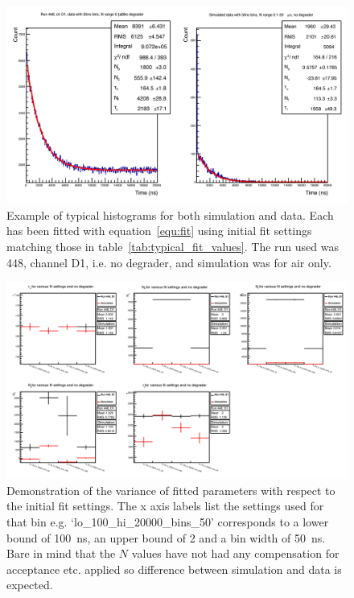 %
\begin{figure}[htbp]
    \centering
        \includegraphics[width=\textwidth]{images/example_fits_data_and_sim.png}
    \caption{Example of typical histograms for both simulation and data. Each has been fitted with equation~\ref{equ:fit} using initial fit settings matching those in table~\ref{tab:typical_fit_values}. The run used was 448, channel D1, i.e. no degrader, and simulation was for air only.}
    \label{fig:example_fits_data_and_sim}
\end{figure}

\begin{figure}[htbp]
    \centering
        \includegraphics[width=\textwidth]{images/sim_vs_data_parameter_WRT_settings.png}
    \caption{Demonstration of the variance of fitted parameters with respect to the initial fit settings. The x axis labels list the settings used for that bin e.g. `lo\_100\_hi\_20000\_bins\_50' corresponds to a lower bound of 100~ns, an upper bound of 2\mus{} and a bin width of 50~ns. Bare in mind that the $N$ values have not had any compensation for acceptance etc. applied so difference between simulation and data is expected.}
    \label{fig:image_sim_vs_data_parameter_WRT_settings}
\end{figure}

